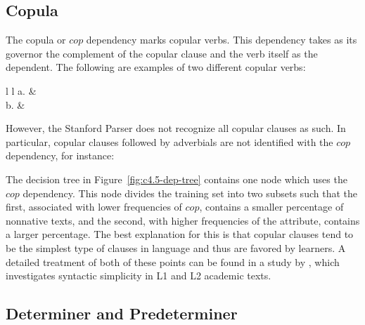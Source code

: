 \documentclass[main.tex]{subfiles}
\begin{document}
\subsection{Copula}

The copula or $cop$ dependency marks copular verbs. This dependency takes as its governor the complement of the copular clause and the verb itself as the dependent. The following \citep[pp. 52-3]{quirk:1985} are examples of two different copular verbs:
\newline\newline\begin{tabular}{ l l }
a. &
\\

b. &
\\
\end{tabular}
\newline

However, the Stanford Parser does not recognize all copular clauses as such. In particular, copular clauses followed by adverbials are not identified with the $cop$ dependency, for instance:

The decision tree in Figure~\ref{fig:c4.5-dep-tree} contains one node which uses the $cop$ dependency. This node divides the training set into two subsets such that the first, associated with lower frequencies of $cop$, contains a smaller percentage of nonnative texts, and the second, with higher frequencies of the attribute, contains a larger percentage. The best explanation for this is that copular clauses tend to be the simplest type of clauses in language and thus are favored by learners. A detailed treatment of both of these points can be found in a study by \citet{hinkel:2003}, which investigates syntactic simplicity in L1 and L2 academic texts.

\subsection{Determiner and Predeterminer}
\end{document}

